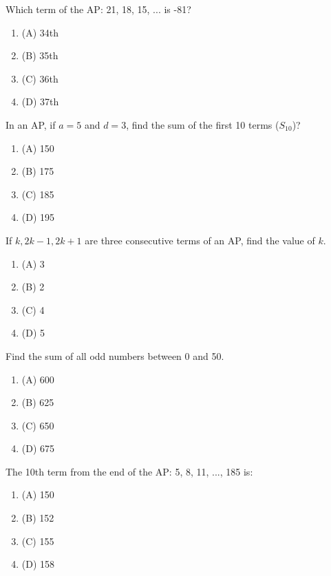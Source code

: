 \documentclass[12pt,a4paper]{exam}
\begin{document}
\begin{questions}
\question[1] Which term of the AP: 21, 18, 15, ... is -81?
\begin{enumerate}[label=(\Alph*)]
  \item (A) 34th
  \item (B) 35th
  \item (C) 36th
  \item (D) 37th
\end{enumerate}
\vspace{0.15cm}

\question[1] In an AP, if $a=5$ and $d=3$, find the sum of the first 10 terms ($S_{10}$)?
\begin{enumerate}[label=(\Alph*)]
  \item (A) 150
  \item (B) 175
  \item (C) 185
  \item (D) 195
\end{enumerate}
\vspace{0.15cm}

\question[1] If $k, 2k-1, 2k+1$ are three consecutive terms of an AP, find the value of $k$.
\begin{enumerate}[label=(\Alph*)]
  \item (A) 3
  \item (B) 2
  \item (C) 4
  \item (D) 5
\end{enumerate}
\vspace{0.15cm}

\question[1] Find the sum of all odd numbers between 0 and 50.
\begin{enumerate}[label=(\Alph*)]
  \item (A) 600
  \item (B) 625
  \item (C) 650
  \item (D) 675
\end{enumerate}
\vspace{0.15cm}

\question[1] The 10th term from the end of the AP: 5, 8, 11, ..., 185 is:
\begin{enumerate}[label=(\Alph*)]
  \item (A) 150
  \item (B) 152
  \item (C) 155
  \item (D) 158
\end{enumerate}
\vspace{0.15cm}


\end{questions}
\end{document}

